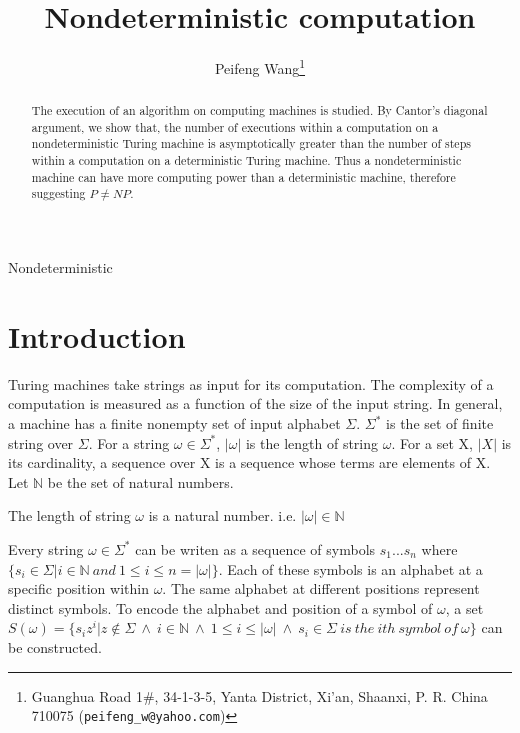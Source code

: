 \documentclass[final,leqno]{siamltex}
\title{Nondeterministic computation}
\author{Peifeng Wang\thanks{Guanghua Road 1\#, 34-1-3-5, Yanta District, Xi'an, Shaanxi, P. R. China 710075 ({\tt peifeng\_w@yahoo.com})}}
\begin{document}
\maketitle

\begin{abstract}
The execution of an algorithm on computing machines is studied. By Cantor's diagonal argument, we show that, the number of executions within a computation on a nondeterministic Turing machine is asymptotically greater than the number of steps within a computation on a deterministic Turing machine. Thus a nondeterministic machine can have more computing power than a deterministic machine, therefore suggesting $P\neq NP$.
\end{abstract}

\begin{keywords} 
Nondeterministic
\end{keywords}

\begin{AMS}

\end{AMS}

\pagestyle{myheadings}
\thispagestyle{plain}
\markboth{}{}


\section{Introduction}
Turing machines take strings as input for its computation. The complexity of a computation is measured as a function of the size of the input string. In general, a machine has a finite nonempty set of input alphabet $\Sigma$. $\Sigma^*$ is the set of finite string over $\Sigma$. For a string $\omega\in\Sigma^*$, $|\omega|$ is the length of string $\omega$. For a set X, $|X|$ is its cardinality, a sequence over X is a sequence whose terms are elements of X. Let $\mathbb{N}$ be the set of natural numbers.

\begin{proposition} 
The length of string $\omega$ is a natural number. i.e. $|\omega|\in\mathbb{N}$
\end{proposition}

Every string $\omega\in\Sigma^*$ can be writen as a sequence of symbols $s_1...s_n$ where $\{s_i\in\Sigma|i\in \mathbb{N} ~ and ~ 1 \le i\le n=|\omega|\}$. Each of these symbols is an alphabet at a specific position within $\omega$. The same alphabet at different positions represent distinct symbols. To encode the alphabet and position of a symbol of $\omega$, a set
$S(\omega)=\{s_iz^i|z\notin\Sigma~ \wedge~ i\in\mathbb{N}~ \wedge~ 1 \le i\le |\omega|~ \wedge~ s_i\in\Sigma~ is~ the~ ith~ symbol~ of~ \omega\}$ can be constructed.
\end{document}

